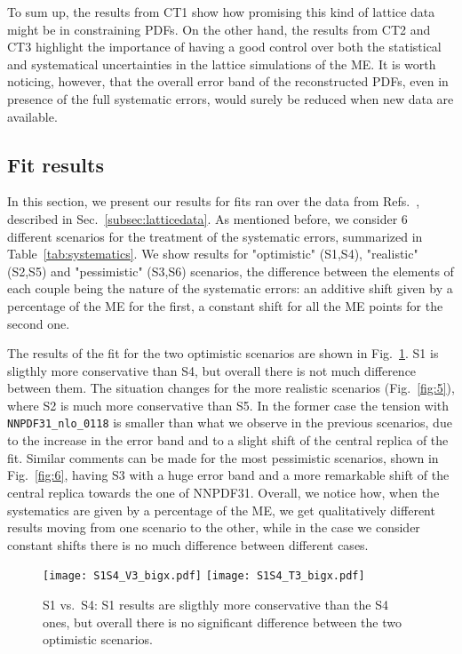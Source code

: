 To sum up, the results from CT1 show how promising this kind of lattice data
might be in constraining PDFs. On the other hand, the results from CT2 and CT3
highlight the importance of having a good control over both the statistical and
systematical uncertainties in the lattice simulations of the ME. It is worth
noticing, however, that the overall error band of the reconstructed PDFs, even in
presence of the full systematic errors, would surely be reduced when new data
are available.
 

\subsection{Fit results}
\label{subsec:fits}
In this section, we present our results for fits ran over the data from
Refs.~\cite{Alexandrou:2018pbm,Alexandrou:2019lfo}, described in Sec.~\ref{subsec:latticedata}. As
mentioned before, we consider 6 different scenarios for the treatment of the
systematic errors, summarized in Table~\ref{tab:systematics}. We show results
for "optimistic" (S1,S4), "realistic" (S2,S5) and "pessimistic" (S3,S6)
scenarios, the difference between the elements of each couple being the nature
of the systematic errors: an additive shift given by a percentage of the ME for
the first, a constant shift for all the ME points for the second one. 

The results of the fit for the two optimistic scenarios are shown in
Fig.~\ref{fig:4}. S1 is sligthly more conservative than S4, but overall there is
not much difference between them. The situation changes for the more realistic
scenarios (Fig.~\ref{fig:5}), where S2 is much more conservative than S5. In the
former case the tension with {\tt NNPDF31\_nlo\_0118} is smaller than what we
observe in the previous scenarios, due to the increase in the error band and to
a slight shift of the central replica of the fit. Similar comments can be made
for the most pessimistic scenarios, shown in Fig.~\ref{fig:6}, having S3 with a
huge error band and a more remarkable shift of the central replica towards the
one of NNPDF31. Overall, we notice how, when the systematics are given by a
percentage of the ME, we get qualitatively different results moving from one
scenario to the other, while in the case we consider constant shifts there is no
much difference between different cases. 
 
\begin{figure}[h]
    \begin{center}
	\texttt{[image: S1S4\_V3\_bigx.pdf]}  
	\texttt{[image: S1S4\_T3\_bigx.pdf]}  
	\caption{S1 vs.\ S4: S1 results are sligthly more conservative than the S4
	ones, but overall there is no significant difference between the two optimistic
	scenarios.}
    \label{fig:4}
    \end{center}
\end{figure}

